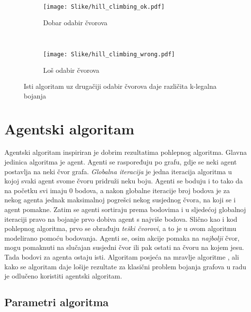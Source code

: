 \documentclass[times, utf8, diplomski, numeric]{fer}
\begin{document}
\begin{figure}
        \centering
        \begin{subfigure}[b]{0.4\textwidth}
                \texttt{[image: Slike/hill\_climbing\_ok.pdf]}
                \caption{Dobar odabir čvorova}
                \label{fig:hill_climbing_ok}
        \end{subfigure}
        ~
        \begin{subfigure}[b]{0.4\textwidth}
                \texttt{[image: Slike/hill\_climbing\_wrong.pdf]}
                \caption{Loš odabir čvorova}
                \label{fig:hill_climbing_wrong}
        \end{subfigure}
        \caption{Isti algoritam uz drugačiji odabir čvorova daje različita k-legalna bojanja}
        \label{fig:hill_climbing}
\end{figure}



\section{Agentski algoritam}

Agentski algoritam inspiriran je dobrim rezultatima pohlepnog algoritma. Glavna jedinica algoritma je agent. Agenti se raspoređuju po grafu, gdje se neki agent postavlja na neki čvor grafa. \emph{Globalna iteracija} je jedna iteracija algoritma u kojoj svaki agent svome čvoru pridruži neku boju. Agenti se boduju i to tako da na početku svi imaju $0$ bodova, a nakon globalne iteracije broj bodova je za nekog agenta jednak maksimalnoj pogrešci nekog susjednog čvora, na koji se i agent pomakne. Zatim se agenti sortiraju prema bodovima i u sljedećoj globalnoj iteraciji pravo na bojanje prvo dobiva agent s najviše bodova. Slično kao i kod pohlepnog algoritma, prvo se obrađuju \emph{teški čvorovi}, a to je u ovom algoritmu modelirano pomoću bodovanja. Agenti se, osim akcije pomaka na \emph{najbolji} čvor, mogu pomaknuti na slučajan susjedni čvor ili pak ostati na čvoru na kojem jesu. Tada bodovi za agenta ostaju isti. Algoritam posjeća na mravlje algoritme  \cite{lit3}, ali kako se algoritam daje lošije rezultate za klasični problem bojanja grafova u radu je odlučeno koristiti agentski algoritam.

\subsection{Parametri algoritma}
\end{document}
